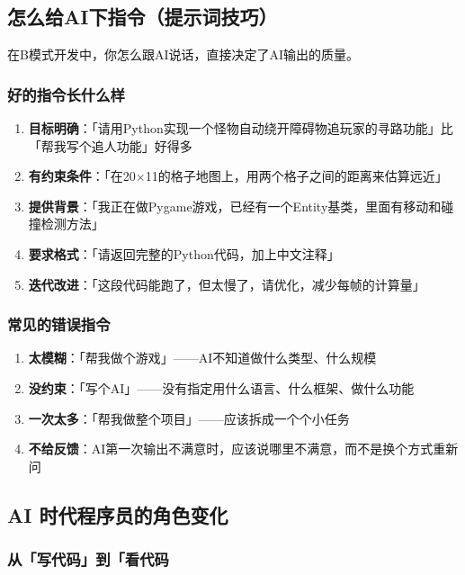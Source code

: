 \documentclass[12pt,a4paper]{article}
\begin{document}
\subsection{怎么给AI下指令（提示词技巧）}

在B模式开发中，你怎么跟AI说话，直接决定了AI输出的质量。

\subsubsection{好的指令长什么样}

\begin{enumerate}[leftmargin=2em]
    \item \textbf{目标明确}：「请用Python实现一个怪物自动绕开障碍物追玩家的寻路功能」比「帮我写个追人功能」好得多
    \item \textbf{有约束条件}：「在20$\times$11的格子地图上，用两个格子之间的距离来估算远近」
    \item \textbf{提供背景}：「我正在做Pygame游戏，已经有一个Entity基类，里面有移动和碰撞检测方法」
    \item \textbf{要求格式}：「请返回完整的Python代码，加上中文注释」
    \item \textbf{迭代改进}：「这段代码能跑了，但太慢了，请优化，减少每帧的计算量」
\end{enumerate}

\subsubsection{常见的错误指令}

\begin{enumerate}[leftmargin=2em]
    \item \textbf{太模糊}：「帮我做个游戏」——AI不知道做什么类型、什么规模
    \item \textbf{没约束}：「写个AI」——没有指定用什么语言、什么框架、做什么功能
    \item \textbf{一次太多}：「帮我做整个项目」——应该拆成一个个小任务
    \item \textbf{不给反馈}：AI第一次输出不满意时，应该说哪里不满意，而不是换个方式重新问
\end{enumerate}

\subsection{AI 时代程序员的角色变化}

\subsubsection{从「写代码」到「看代码}
\end{document}
